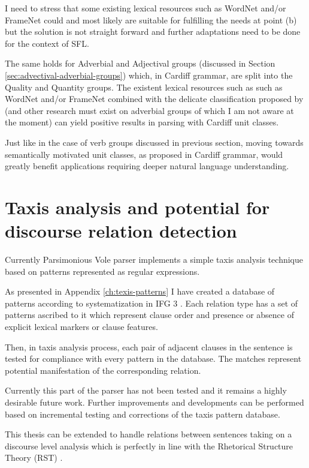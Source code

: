I need to stress that some existing lexical resources such as WordNet \citep{Miller1995} and/or FrameNet\citep{Baker1998} could and most likely are suitable for fulfilling the needs at point (b) but the solution is not straight forward and further adaptations need to be done for the context of SFL.

The same holds for Adverbial and Adjectival groups (discussed in Section \ref{sec:advectival-adverbial-groups}) which, in Cardiff grammar, are split into the Quality and Quantity groups. The existent lexical resources such as such as WordNet \citep{Miller1995} and/or FrameNet\citep{Baker1998} combined with the delicate classification proposed by \citet{Tucker1997} (and other research must exist on adverbial groups of which I am not aware at the moment) can yield positive results in parsing with Cardiff unit classes. 

Just like in the case of verb groups discussed in previous section, moving towards semantically motivated unit classes, as proposed in Cardiff grammar, would greatly benefit applications requiring deeper natural language understanding.

\section{Taxis analysis and potential for discourse relation detection}
Currently Parsimonious Vole parser implements a simple taxis analysis technique based on patterns represented as regular expressions. 

As presented in Appendix \ref{ch:texis-patterns} I have created a database of patterns according to systematization in IFG 3 \citep{Halliday2004}. Each relation type has a set of patterns ascribed to it which represent clause order and presence or absence of explicit lexical markers or clause features. 

Then, in taxis analysis process, each pair of adjacent clauses in the sentence is tested for compliance with every pattern in the database. The matches represent potential manifestation of the corresponding relation.  

Currently this part of the parser has not been tested and it remains a highly desirable future work. Further improvements and developments can be performed based on incremental testing and corrections of the taxis pattern database.

This thesis can be extended to handle relations between sentences taking on a discourse level analysis which is perfectly in line with the Rhetorical Structure Theory (RST) \citep{Mann1988,Mann1992}. 

